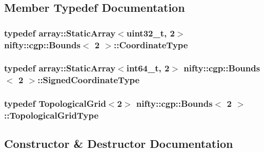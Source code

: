 \subsection{Member Typedef Documentation}
\hypertarget{classnifty_1_1cgp_1_1Bounds_3_012_01_4_aa7c3be371d84aea05e916a30d859d7ff}{}
\subsubsection[{Coordinate\+Type}]{\setlength{\rightskip}{0pt plus 5cm}typedef {\bf array\+::\+Static\+Array}$<$uint32\+\_\+t, 2$>$ {\bf nifty\+::cgp\+::\+Bounds}$<$ 2 $>$\+::{\bf Coordinate\+Type}}\label{classnifty_1_1cgp_1_1Bounds_3_012_01_4_aa7c3be371d84aea05e916a30d859d7ff}
\hypertarget{classnifty_1_1cgp_1_1Bounds_3_012_01_4_aa2abaddff55015fc8a158881f4e90571}{}
\subsubsection[{Signed\+Coordinate\+Type}]{\setlength{\rightskip}{0pt plus 5cm}typedef {\bf array\+::\+Static\+Array}$<$int64\+\_\+t, 2$>$ {\bf nifty\+::cgp\+::\+Bounds}$<$ 2 $>$\+::{\bf Signed\+Coordinate\+Type}}\label{classnifty_1_1cgp_1_1Bounds_3_012_01_4_aa2abaddff55015fc8a158881f4e90571}
\hypertarget{classnifty_1_1cgp_1_1Bounds_3_012_01_4_a97f375ade92ba9870b7a31da87626337}{}
\subsubsection[{Topological\+Grid\+Type}]{\setlength{\rightskip}{0pt plus 5cm}typedef {\bf Topological\+Grid}$<$2$>$ {\bf nifty\+::cgp\+::\+Bounds}$<$ 2 $>$\+::{\bf Topological\+Grid\+Type}}\label{classnifty_1_1cgp_1_1Bounds_3_012_01_4_a97f375ade92ba9870b7a31da87626337}


\subsection{Constructor \& Destructor Documentation}
\hypertarget{classnifty_1_1cgp_1_1Bounds_3_012_01_4_aadcad33a9b3fa58464bae7aae61f3f5d}{}
